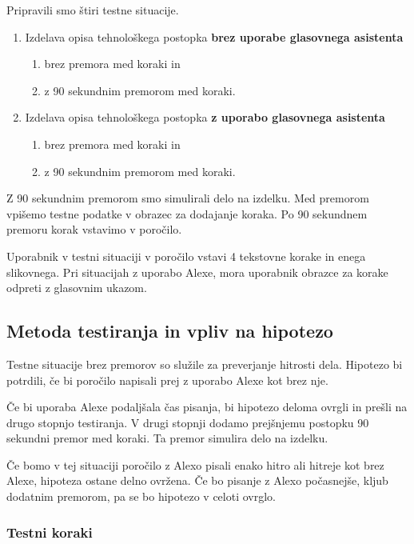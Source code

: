 \documentclass[a4paper, 12pt]{book}
\begin{document}
Pripravili smo štiri testne situacije.

\begin{enumerate}
	\item Izdelava opisa tehnološkega postopka \textbf{brez uporabe glasovnega asistenta}
		\begin{enumerate}
			\item brez premora med koraki in
			\item z 90 sekundnim premorom med koraki.
		\end{enumerate}
	\item Izdelava opisa tehnološkega postopka \textbf{z uporabo glasovnega asistenta}
		\begin{enumerate}
			\item brez premora med koraki in
			\item z 90 sekundnim premorom med koraki.
		\end{enumerate}
\end{enumerate}

Z 90 sekundnim premorom smo simulirali delo na izdelku.
Med premorom vpišemo testne podatke v obrazec za dodajanje koraka.
Po 90 sekundnem premoru korak vstavimo v poročilo.

Uporabnik v testni situaciji v poročilo vstavi 4 tekstovne korake in enega slikovnega.
Pri situacijah z uporabo Alexe, mora uporabnik obrazce za korake odpreti z glasovnim ukazom.

\subsection{Metoda testiranja in vpliv na hipotezo}

Testne situacije brez premorov so služile za preverjanje hitrosti dela.
Hipotezo bi potrdili, če bi poročilo napisali prej z uporabo Alexe kot brez nje.

Če bi uporaba Alexe podaljšala čas pisanja, bi hipotezo deloma ovrgli in prešli na drugo stopnjo testiranja.
V drugi stopnji dodamo prejšnjemu postopku 90 sekundni premor med koraki.
Ta premor simulira delo na izdelku.

Če bomo v tej situaciji poročilo z Alexo pisali enako hitro ali hitreje kot brez Alexe, hipoteza ostane delno ovržena.
Če bo pisanje z Alexo počasnejše, kljub dodatnim premorom, pa se bo hipotezo v celoti ovrglo.

\subsubsection{Testni koraki}
\end{document}
